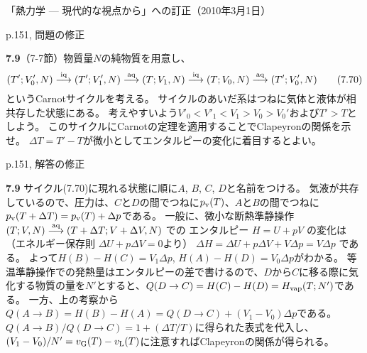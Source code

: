 \documentclass[12pt]{jarticle}
\newcommand{\too}[1]{\stackrel{\rm #1}{\longrightarrow}}
\newcommand{\tooaq}{\too{aq}}
\newcommand{\tooiq}{\too{iq}}
\newcommand{\pv}{p_{\rm v}}
\newcommand{\vl}{v_{\rm L}}
\newcommand{\vg}{v_{\rm G}}
\newcommand{\DT}{\Delta T}
\newcommand{\Dp}{\Delta p}
\begin{document}
\begin{flushright}
\footnotesize
「熱力学 --- 現代的な視点から」への訂正（2010年3月1日）
\end{flushright}
\noindent
p.151, 問題の修正 
\bigskip

\noindent
{\bf 7.9}（7-7節）物質量$N$の純物質を用意し、
\begin{equation}
(T';V'_0,N)\tooiq(T';V'_1,N)\tooaq(T;V_1,N)\tooiq(T;V_0,N)\tooaq(T';V'_0,N)
\tag{7.70}
\end{equation}
というCarnotサイクルを考える。
サイクルのあいだ系はつねに気体と液体が相共存した状態にある。
考えやすいよう$V'_0<V'_1<V_1>V_0>V_0'$および$T'>T$としよう。
このサイクルにCarnotの定理を適用することでClapeyronの関係を示せ。
$\DT=T'-T$が微小としてエンタルピーの変化に着目するとよい。


\bigskip\bigskip
\noindent
p.151, 解答の修正 
\bigskip

\noindent
{\bf 7.9} サイクル(7.70)に現れる状態に順に$A$, $B$, $C$, $D$と名前をつける。
気液が共存しているので、圧力は、$C$と$D$の間でつねに$\pv(T)$、$A$と$B$の間でつねに$\pv(T+\DT)=\pv(T)+\Dp$である。
一般に、微小な断熱準静操作 $(T;V,N)\tooaq(T+\Delta T;V+\Delta V,N)$ での
エンタルピー $H=U+pV$ の変化は（エネルギー保存則 $\Delta U+p\Delta V=0$より）
$\Delta H=\Delta U+p\Delta V+V\Delta p=V\Delta p$ である。
よって$H(B)-H(C)=V_1\Dp$, $H(A)-H(D)=V_0\Dp$がわかる。
等温準静操作での発熱量はエンタルピーの差で書けるので、$D$から$C$に移る際に気化する物質の量を$N'$とすると、$Q(D\to C)=H(C)-H(D)=H_{\rm vap}(T;N')$である。
一方、上の考察から$Q(A \to B)=H(B)-H(A)=Q(D\to C)+(V_1-V_0)\Dp$である。
$Q(A\to B)/Q(D\to C)=1+(\DT/T)$に得られた表式を代入し、$(V_1-V_0)/N'=\vg(T)-\vl(T)$に注意すればClapeyronの関係が得られる。


\end{document}
